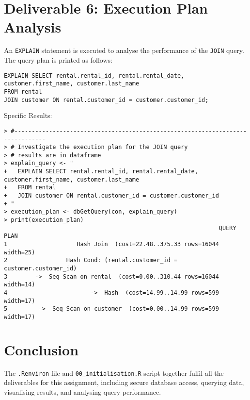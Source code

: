 \documentclass[a4paper,11pt]{extarticle}
\begin{document}
\section*{Deliverable 6: Execution Plan Analysis}
An \texttt{EXPLAIN} statement is executed to analyse the performance of the \texttt{JOIN} query. The query plan is printed as follows:
\begin{verbatim}
EXPLAIN SELECT rental.rental_id, rental.rental_date, customer.first_name, customer.last_name
FROM rental
JOIN customer ON rental.customer_id = customer.customer_id;
\end{verbatim}
Specific Results:
\begin{verbatim}
> #-------------------------------------------------------------------------------
> # Investigate the execution plan for the JOIN query
> # results are in dataframe 
> explain_query <- "
+   EXPLAIN SELECT rental.rental_id, rental.rental_date, customer.first_name, customer.last_name
+   FROM rental
+   JOIN customer ON rental.customer_id = customer.customer_id
+ "
> execution_plan <- dbGetQuery(con, explain_query)
> print(execution_plan)
                                                              QUERY PLAN
1                    Hash Join  (cost=22.48..375.33 rows=16044 width=25)
2                 Hash Cond: (rental.customer_id = customer.customer_id)
3        ->  Seq Scan on rental  (cost=0.00..310.44 rows=16044 width=14)
4                        ->  Hash  (cost=14.99..14.99 rows=599 width=17)
5         ->  Seq Scan on customer  (cost=0.00..14.99 rows=599 width=17)
\end{verbatim}
\section*{Conclusion}
The \texttt{.Renviron} file and \texttt{00\_initialisation.R} script together fulfil all the deliverables for this assignment, including secure database access, querying data, visualising results, and analysing query performance.
\end{document}
